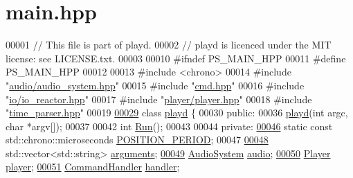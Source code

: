 \hypertarget{main_8hpp_source}{\section{main.\+hpp}
\label{main_8hpp_source}
}

\begin{DoxyCode}
00001 \textcolor{comment}{// This file is part of playd.}
00002 \textcolor{comment}{// playd is licenced under the MIT license: see LICENSE.txt.}
00003 
00010 \textcolor{preprocessor}{#ifndef PS\_MAIN\_HPP}
00011 \textcolor{preprocessor}{#define PS\_MAIN\_HPP}
00012 
00013 \textcolor{preprocessor}{#include <chrono>}
00014 \textcolor{preprocessor}{#include "\hyperlink{audio__system_8hpp}{audio/audio\_system.hpp}"}
00015 \textcolor{preprocessor}{#include "\hyperlink{cmd_8hpp}{cmd.hpp}"}
00016 \textcolor{preprocessor}{#include "\hyperlink{io__reactor_8hpp}{io/io\_reactor.hpp}"}
00017 \textcolor{preprocessor}{#include "\hyperlink{player_8hpp}{player/player.hpp}"}
00018 \textcolor{preprocessor}{#include "\hyperlink{time__parser_8hpp}{time\_parser.hpp}"}
00019 
\hypertarget{main_8hpp_source_l00029}{}\hyperlink{classplayd}{00029} \textcolor{keyword}{class }\hyperlink{classplayd}{playd} \{
00030 \textcolor{keyword}{public}:
00036     \hyperlink{classplayd_a2dfa519ee11ce75fbe389fcf3b15e122}{playd}(\textcolor{keywordtype}{int} argc, \textcolor{keywordtype}{char} *argv[]);
00037 
00042     \textcolor{keywordtype}{int} \hyperlink{classplayd_aee84626965c812db03120ebe3267fcab}{Run}();
00043 
00044 \textcolor{keyword}{private}:
\hypertarget{main_8hpp_source_l00046}{}\hyperlink{classplayd_a540bcb2dac9488bcb8e593378005bd07}{00046}     \textcolor{keyword}{static} \textcolor{keyword}{const} std::chrono::microseconds \hyperlink{classplayd_a540bcb2dac9488bcb8e593378005bd07}{POSITION\_PERIOD};
00047 
\hypertarget{main_8hpp_source_l00048}{}\hyperlink{classplayd_a58d45d86bd51dea16f476aae648ff63c}{00048}     std::vector<std::string> \hyperlink{classplayd_a58d45d86bd51dea16f476aae648ff63c}{arguments}; 
\hypertarget{main_8hpp_source_l00049}{}\hyperlink{classplayd_a2c7193680bd18f1e9b3f63f2234485de}{00049}     \hyperlink{classAudioSystem}{AudioSystem} \hyperlink{classplayd_a2c7193680bd18f1e9b3f63f2234485de}{audio};                  
\hypertarget{main_8hpp_source_l00050}{}\hyperlink{classplayd_a8712fc23f3139a2fd2e9dbfb24b998dd}{00050}     \hyperlink{classPlayer}{Player} \hyperlink{classplayd_a8712fc23f3139a2fd2e9dbfb24b998dd}{player};                      
\hypertarget{main_8hpp_source_l00051}{}\hyperlink{classplayd_a738bb18c13d3fd7db82ce000dd43d604}{00051}     \hyperlink{classCommandHandler}{CommandHandler} \hyperlink{classplayd_a738bb18c13d3fd7db82ce000dd43d604}{handler};             

\end{DoxyCode}
